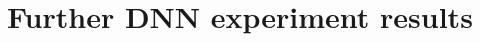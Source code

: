 \documentclass{article}
\theoremstyle{plain}
\theoremstyle{definition}
\theoremstyle{remark}
\begin{document}
\clearpage

\section{Further DNN experiment results}\label{app:more_experiments_dnn}
\setlength{\tabcolsep}{6pt}

\end{document}
